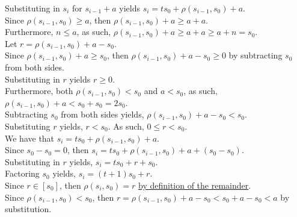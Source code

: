 \documentclass[a4paper,12pt]{article}
\begin{document}
\noindent Substituting in $s_i$ for $s_{i - 1} + a$ yields $s_i = ts_0 + \rho(s_{i - 1}, s_0) + a$.\\

\noindent Since $\rho(s_{i - 1}, s_0) \geq a$, then $\rho(s_{i - 1}, s_0) + a \geq a + a$.\\

\noindent Furthermore, $n \leq a$, as such, $\rho(s_{i - 1}, s_0) + a \geq a + a \geq a + n = s_0$.\\

\noindent Let $r = \rho(s_{i - 1}, s_0) + a - s_0$.\\

\noindent Since $\rho(s_{i - 1}, s_0) + a \geq s_0$, then $\rho(s_{i - 1}, s_0) + a - s_0 \geq 0$ by subtracting $s_0$ from both sides.\\

\noindent Substituting in $r$ yields $r \geq 0$.\\

\noindent Furthermore, both $\rho(s_{i - 1}, s_0) < s_0$ and $a < s_0$, as such,\\ $\rho(s_{i - 1}, s_0) + a < s_0 + s_0 = 2s_0$.\\

\noindent Subtracting $s_0$ from both sides yields, $\rho(s_{i - 1}, s_0) + a - s_0 < s_0$.\\

\noindent Substituting $r$ yields, $r < s_0$. As such, $0 \leq r < s_0$.\\

\noindent We have that $s_i = ts_0 + \rho(s_{i - 1}, s_0) + a$.\\

\noindent Since $s_0 - s_0 = 0$, then $s_i = ts_0 + \rho(s_{i - 1}, s_0) + a + (s_0 - s_0)$.\\

\noindent Substituting in $r$ yields, $s_i = ts_0 + r + s_0$.\\

\noindent Factoring $s_0$ yields, $s_i = (t + 1)s_0 + r$.\\

\noindent Since $r \in [s_0]$, then $\rho(s_i, s_0) = r$ \hyperlink{theorem:remainder_theorem}{by definition of the remainder}.\\

\noindent Since $\rho(s_{i - 1}, s_0) < s_0$, then $r = \rho(s_{i - 1}, s_0) + a - s_0 < s_0 + a - s_0 < a$ by substitution.\\
\end{document}

